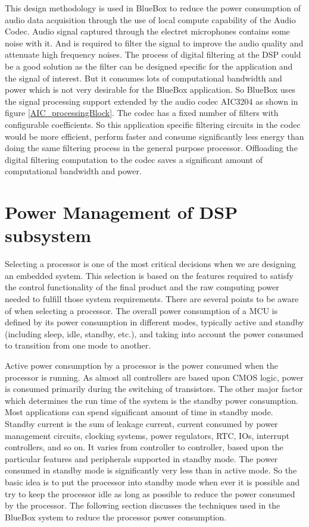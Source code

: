 \hspace{10mm}This design methodology is used in BlueBox to reduce the power consumption of audio data acquisition through the use of local compute capability of the Audio Codec. Audio signal captured through the electret microphones contains some noise with it. And is required to filter the signal to improve the audio quality and attenuate high frequency noises. The process of digital filtering at the DSP could be a good solution as the filter can be designed specific for the application and the signal of interest. But it consumes lots of computational bandwidth and power which is not very desirable for the BlueBox application. So BlueBox uses the signal processing support extended by the audio codec AIC3204 as shown in figure \ref{AIC_processingBlock}. The codec has a fixed number of filters with configurable coefficients. So this application specific filtering circuits in the codec would be more efficient, perform faster and consume significantly less energy than doing the same filtering process in the general purpose processor. Offloading the digital filtering computation to the codec saves a significant amount of computational bandwidth and power.
 
\section{Power Management of DSP subsystem }

Selecting a processor is one of the most critical decisions when we are designing an embedded 
system. This selection is based on the features required to satisfy the control functionality of the final product and the raw computing power needed to fulfill those system requirements. There are several points to be aware of when selecting a processor. The overall power consumption of a MCU is defined by its power consumption in different modes, typically active and standby (including sleep, idle, standby, etc.), and taking into account the power consumed to transition from one mode to another. 

 \hspace{10mm}Active power consumption by a processor is the power consumed when the processor is running. As almost all controllers are based upon CMOS logic, power is consumed primarily during the switching of transistors. The other major factor which determines the run time of the system is the standby power consumption. Most applications can spend significant amount of time in standby mode. Standby current is the sum of leakage current, current consumed by power management circuits, clocking systems, power regulators, RTC, IOs, interrupt controllers, and so on. It varies from controller to controller, based upon the particular features and peripherals supported in standby mode. The power consumed in standby mode is significantly very less than in active mode. So the basic idea is to put the processor into standby mode when ever it is possible and try to keep the processor idle as long as possible to reduce the power consumed by the processor. The following section discusses the techniques used in the BlueBox system to reduce the processor power consumption. 


